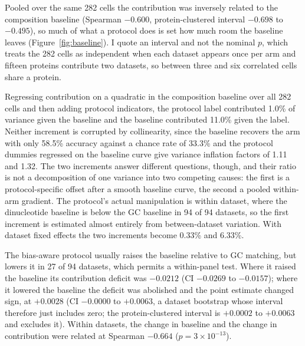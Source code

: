 Pooled over the same 282 cells the contribution was inversely related to the
composition baseline (Spearman $-0.600$, protein-clustered interval $-0.698$ to $-0.495$), so
much of what a protocol does is set how much room the baseline leaves
(Figure~\ref{fig:baseline}). I quote an interval and not the nominal $p$, which treats the 282
cells as independent when each dataset appears once per arm and fifteen proteins contribute two
datasets, so between three and six correlated cells share a protein.

Regressing contribution on a quadratic in the composition baseline over all 282 cells and then
adding protocol indicators, the protocol label contributed 1.0\% of variance given the baseline
and the baseline contributed 11.0\% given the label. Neither increment is corrupted by
collinearity, since the baseline recovers the arm with only 58.5\% accuracy against a chance
rate of 33.3\% and the protocol dummies regressed on the baseline curve give variance inflation
factors of 1.11 and 1.32. The two increments answer different questions, though, and their ratio
is not a decomposition of one variance into two competing causes: the first is a
protocol-specific offset after a smooth baseline curve, the second a pooled within-arm gradient. The
protocol's actual manipulation is within dataset, where the dinucleotide baseline is below the
GC baseline in 94 of 94 datasets, so the first increment is estimated almost entirely from
between-dataset variation. With dataset fixed effects the two increments become 0.33\% and
6.33\%.

The bias-aware protocol usually raises the baseline relative to GC matching, but lowers it in 27
of 94 datasets, which permits a within-panel test. Where it raised the baseline its contribution
deficit was $-0.0212$ (CI $-0.0269$ to $-0.0157$); where it lowered the baseline the deficit was
abolished and the point estimate changed sign, at $+0.0028$ (CI $-0.0000$ to $+0.0063$, a
dataset bootstrap whose interval therefore just includes zero; the protein-clustered interval is
$+0.0002$ to $+0.0063$ and excludes it). Within datasets,
the change in baseline and the change in contribution were related at Spearman $-0.664$
($p=3\times10^{-13}$).

